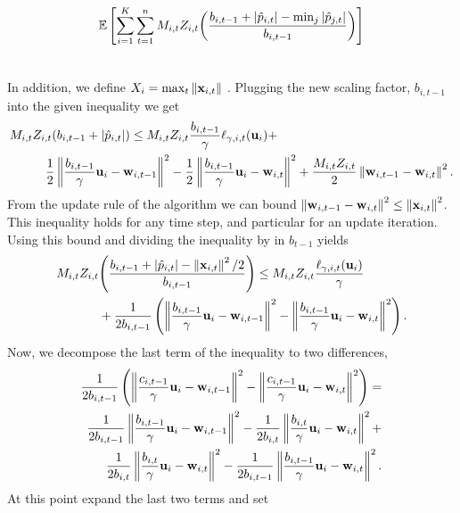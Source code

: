 \begin{equation*}
\begin{split}
\mathbb{E}&\left[{\sum_{i=1}^{K}\sum_{t=1}^{n}M_{i,t}Z_{i,t}{\left({\frac{b_{i,t-1} +\left\vert{\hat{p}_{i,t}}\right\vert-\min_j\left\vert{\hat{p}_{j,t}}\right\vert}{b_{i,t-1}}}\right)}}\right]\\
&~
\end{split}
\end{equation*}
\QED



In addition, we define $X_i=\max_t{\Vert\mathbf{x}_{i,t}\Vert}$ . Plugging the new scaling factor, $b_{i,t-1}$ into the given inequality we get 
\begin{equation*}
\begin{split}
M_{i,t}Z_{i,t}{\left({b_{i,t-1} +\left\vert{\hat{p}_{i,t}}\right\vert}\right)} \le M_{i,t}&Z_{i,t}\frac{b_{i,t-1}}{\gamma} \ell_{\gamma,i,t}(\mathbf{u}_i)+\\ 
\frac{1}{2}\left\Vert {\frac{b_{i,t-1}}{\gamma} \mathbf{u}_i-\mathbf{w}_{i,t-1}} \right\Vert^2&-\frac{1}{2}\left\Vert {\frac{b_{i,t-1}}{\gamma} \mathbf{u}_i-\mathbf{w}_{i,t}} \right\Vert^2+
\frac{M_{i,t}Z_{i,t}}{2}\left\Vert {\mathbf{w}_{i,t-1}-\mathbf{w}_{i,t}} \right\Vert^2.
\end{split}
\end{equation*}
 From the update rule of the  algorithm we can bound $\left\Vert {\mathbf{w}_{i,t-1}-\mathbf{w}_{i,t}} \right\Vert^2\le \left\Vert {\mathbf{x}_{i,t}} \right\Vert^2$. This inequality holds for any time step, and particular for an update iteration. Using this bound and dividing the inequality by in  $b_{t-1}$ yields
\begin{equation}
\begin{split}
M_{i,t}Z_{i,t}&{\left({\frac{b_{i,t-1} +\left\vert{\hat{p}_{i,t}}\right\vert-\left\Vert {\mathbf{x}_{i,t}} \right\Vert^2/2}{b_{i,t-1}}}\right)} \le M_{i,t}Z_{i,t}\frac{\ell_{\gamma,i,t}(\mathbf{u}_i)}{\gamma} \\ 
&+\frac{1}{2b_{i,t-1
}}\left({\left\Vert {\frac{b_{i,t-1}}{\gamma} \mathbf{u}_i-\mathbf{w}_{i,t-1}} \right\Vert^2-\left\Vert {\frac{b_{i,t-1}}{\gamma} \mathbf{u}_i-\mathbf{w}_{i,t}} \right\Vert^2}\right).
\label{eq:adaptive_b_first_step}
\end{split}
\end{equation}
Now, we decompose the last term of the inequality to two  differences,
\begin{equation*}
\begin{split}
\frac{1}{2b_{i,t-1}}
\left({\left\Vert {\frac{c_{i,t-1}}{\gamma} \mathbf{u}_i-\mathbf{w}_{i,t-1}} \right\Vert^2-\left\Vert {\frac{c_{i,t-1}}{\gamma} \mathbf{u}_i-\mathbf{w}_{i,t}} \right\Vert^2}\right)= \\
\frac{1}{2b_{i,t-1}}\left\Vert {\frac{b_{i,t-1}}{\gamma} \mathbf{u}_i-\mathbf{w}_{i,t-1}} \right\Vert^2-\frac{1}{2b_{i,t}}\left\Vert {\frac{b_{i,t}}{\gamma} \mathbf{u}_i-\mathbf{w}_{i,t}} \right\Vert^2+\\
\frac{1}{2b_{i,t}}\left\Vert {\frac{b_{i,t}}{\gamma} \mathbf{u}_i-\mathbf{w}_{i,t}} \right\Vert^2-\frac{1}{2b_{i,t-1}}\left\Vert {\frac{b_{i,t-1}}{\gamma} \mathbf{u}_i-\mathbf{w}_{i,t}} \right\Vert^2.
\end{split}
\end{equation*}
At this point  expand the last two terms and  set   

